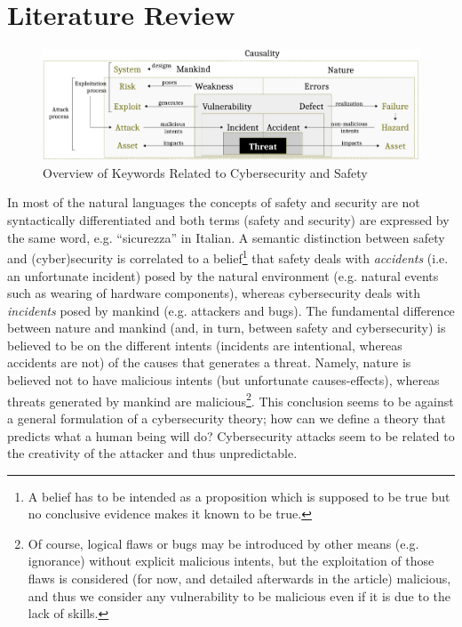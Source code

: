 \documentclass[conference]{IEEEtran}
\begin{document}
\section{Literature Review}\label{sec:literature}
\begin{figure}[t]
	\centering
	\includegraphics[width=.8\textwidth]{safety-security_3.pdf}
	\caption{Overview of Keywords Related to Cybersecurity and Safety}
	\label{fig:safety-security}
\end{figure}

In most of the natural languages the concepts of safety
and security are not syntactically differentiated and both terms (safety and
security) are expressed by the same word, e.g. ``sicurezza'' in Italian.  A
semantic distinction between safety and (cyber)security is correlated to a
belief\footnote{A belief has to be intended as a proposition which is supposed
to be true but no conclusive evidence makes it known to be true.} that
safety deals with \emph{accidents} (i.e. an unfortunate incident) posed by the
natural environment (e.g. natural events such as wearing of hardware
components), whereas cybersecurity deals with \emph{incidents} posed by mankind (e.g.
attackers and bugs). The fundamental difference between nature and mankind (and,
in turn, between safety and cybersecurity) is believed to be on the different
intents (incidents are intentional, whereas accidents are not) of the causes
that generates a threat. Namely, nature is believed not to have malicious
intents (but unfortunate causes-effects), whereas threats generated by mankind are
malicious\footnote{Of course, logical flaws or bugs may be
introduced by other means (e.g. ignorance) without explicit malicious intents,
but the exploitation of those flaws is considered (for now, and detailed
afterwards in the article) malicious, and thus we consider any vulnerability to
be malicious even if it is due to the lack of skills.}.
This conclusion seems to be against a general formulation of a cybersecurity theory;
how can we define a theory that predicts what a human being will do?
Cybersecurity attacks seem to be related to the creativity of the attacker
and thus unpredictable. 
\end{document}
